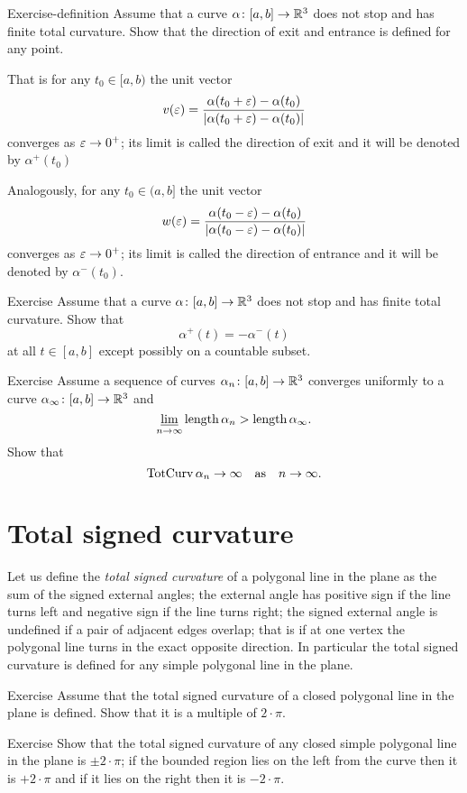 \begin{thm}{Exercise-definition} 
Assume that a curve $\alpha\colon[a,b]\to\mathbb{R}^3$ does not stop and has finite total curvature.
Show that the direction of exit and entrance is defined for any point.

That is for any $t_0\in [a,b)$ the unit vector  
\[v(\varepsilon)=\frac{\alpha(t_0+\varepsilon)-\alpha(t_0)}{|\alpha(t_0+\varepsilon)-\alpha(t_0)|}\] converges as $\varepsilon\to0^+$;
its limit is called the direction of exit and it will be denoted by $\alpha^+(t_0)$

Analogously, for any $t_0\in (a,b]$ the unit vector  
\[w(\varepsilon)=\frac{\alpha(t_0-\varepsilon)-\alpha(t_0)}{|\alpha(t_0-\varepsilon)-\alpha(t_0)|}\] 
converges as $\varepsilon\to0^+$;
its limit is called the direction of entrance and it will be denoted by $\alpha^-(t_0)$.
\end{thm}

\begin{thm}{Exercise} 
Assume that a curve $\alpha\colon[a,b]\to\mathbb{R}^3$ does not stop and has finite total curvature.
Show that 
\[\alpha^+(t)=-\alpha^-(t)\]
at all $t\in[a,b]$ except possibly on a countable subset.
\end{thm}

\begin{thm}{Exercise} 
Assume a sequence of curves $\alpha_n\colon[a,b]\to\mathbb{R}^3$ converges uniformly to a curve $\alpha_\infty\colon[a,b]\to\mathbb{R}^3$ and
\[ \varliminf_{n\to\infty}\mathop{\rm length}\nolimits\alpha_n>\mathop{\rm length}\nolimits\alpha_\infty.\]
Show that 
\[\mathop{\rm TotCurv}\nolimits\alpha_n\to\infty\quad\text{as}\quad n\to\infty.\]

\end{thm}


\section{Total signed curvature}

Let us define the \emph{total signed curvature} of a polygonal line in the plane as the sum of the signed external angles;
the external angle has positive sign if the line turns left and negative sign if the line turns right; the signed external angle is undefined if a pair of adjacent edges overlap;
that is if at one vertex the polygonal line turns in the exact opposite direction.
In particular the total signed curvature is defined for any simple polygonal line in the plane.

\begin{thm}{Exercise}\label{ex:2kpi}
Assume that the total signed curvature of a closed polygonal line in the plane is defined.
Show that it is a multiple of $2\cdot\pi$.
\end{thm}


\begin{thm}{Exercise}\label{ex:pm2pi}
Show that the total signed curvature of any closed simple polygonal line in the plane is $\pm2\cdot\pi$; 
if the bounded region lies on the left from the curve then it is $+2\cdot\pi$ and if it lies on the right then it is $-2\cdot\pi$.
\end{thm}
